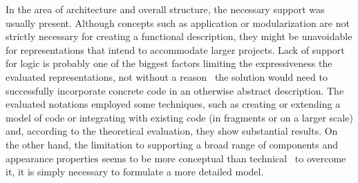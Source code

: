 In the area of architecture and overall structure, the necessary support was usually present.
Although concepts such as application or modularization are not strictly necessary for creating a functional description, they might be unavoidable for representations that intend to accommodate larger projects.
Lack of support for logic is probably one of the biggest factors limiting the expressiveness the evaluated representations, not without a reason \textendash\ the solution would need to successfully incorporate concrete code in an otherwise abstract description.
The evaluated notations employed some techniques, such as creating or extending a model of code or integrating with existing code (in fragments or on a larger scale) and, according to the theoretical evaluation, they show substantial results.
On the other hand, the limitation to supporting a broad range of components and appearance properties seems to be more conceptual than technical \textendash\ to overcome it, it is simply necessary to formulate a more detailed model.




